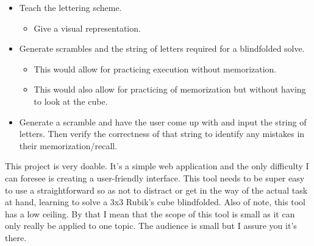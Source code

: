 \documentclass[12pt]{article}
\begin{document}
\begin{itemize}
   \item Teach the lettering scheme.

   \begin{itemize}
      \item Give a visual representation.
   \end{itemize}

   \item Generate scrambles and the string of letters required for a blindfolded solve. 
      \begin{itemize}
         \item This would allow for practicing execution without memorization.
         \item This would also allow for practicing of memorization but without having to look at the cube.
      \end{itemize}
      
   \item Generate a scramble and have the user come up with and input the string of letters. Then verify the correctness of that string to identify any mistakes in their memorization/recall.

\end{itemize}

   This project is very doable. It’s a simple web application and the only difficulty I can foresee is creating a user-friendly interface. This tool needs to be super easy to use a straightforward so as not to distract or get in the way of the actual task at hand, learning to solve a 3x3 Rubik’s cube blindfolded. Also of note, this tool has a low ceiling. By that I mean that the scope of this tool is small as it can only really be applied to one topic. The audience is small but I assure you it’s there. 







\end{document}
